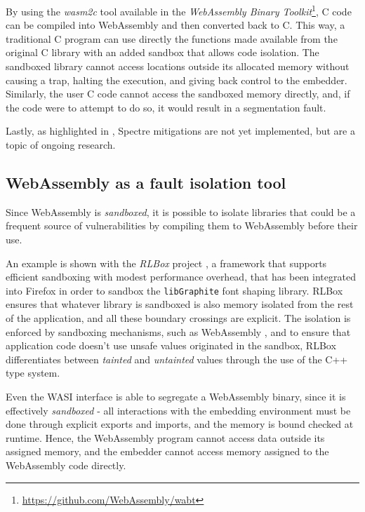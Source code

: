 By using the \textit{wasm2c} tool available in the \textit{WebAssembly Binary Toolkit}\footnote{\url{https://github.com/WebAssembly/wabt}},
C code can be compiled into WebAssembly and then converted back to C.
This way, a traditional C program can use directly the functions made available from the original C library with an added sandbox
that allows code isolation. The sandboxed library cannot access locations outside its allocated memory without causing a trap,
halting the execution, and giving back control to the embedder.
Similarly, the user C code cannot access the sandboxed memory directly, and, if the code were to attempt to do so,
it would result in a segmentation fault.

Lastly, as highlighted in \cite{wasmtime-security-sandboxing}, Spectre mitigations are not yet implemented, but are a topic of
ongoing research.

\subsection{WebAssembly as a fault isolation tool}

Since WebAssembly is \textit{sandboxed}, it is possible to isolate libraries that could be a frequent source of
vulnerabilities by compiling them to WebAssembly before their use.

An example is shown with the \textit{RLBox} project \cite{wasm-firefox-isolation-2020, rlbox-docs},
a framework that supports efficient sandboxing with modest performance overhead,
that has been integrated into Firefox in order to sandbox the \texttt{libGraphite} font shaping library.
RLBox ensures that whatever library is sandboxed is also memory isolated from the rest of the application,
and all these boundary crossings are explicit. The isolation is enforced by sandboxing mechanisms, such as
WebAssembly \cite{wasm-sandboxing-firefox}, and to ensure that application code doesn't use unsafe values
originated in the sandbox, RLBox differentiates between \textit{tainted} and \textit{untainted} values
through the use of the C++ type system.

Even the WASI interface is able to segregate a WebAssembly binary, since it is effectively \textit{sandboxed}
- all interactions with the embedding environment must be done through explicit exports and imports, and the memory is
bound checked at runtime. Hence, the WebAssembly program cannot access data outside its assigned memory, and the
embedder cannot access memory assigned to the WebAssembly code directly.

